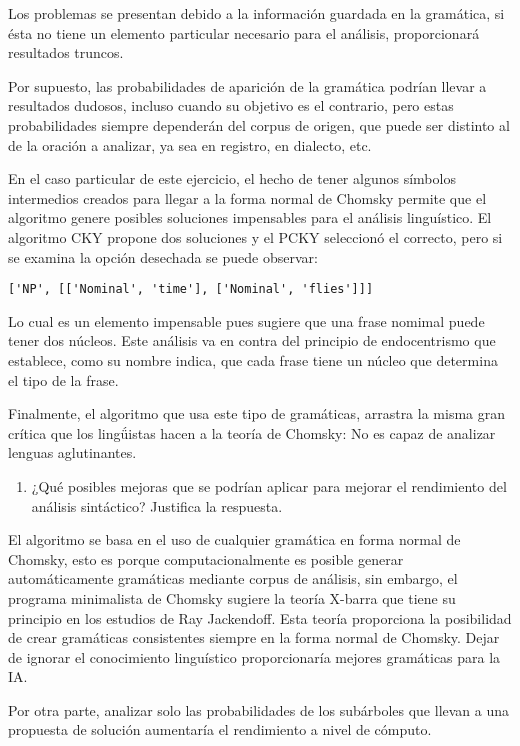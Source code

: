\documentclass[12pt,a4paper,table]{article}
\providecommand{\tightlist}{%
      \setlength{\itemsep}{0pt}\setlength{\parskip}{0pt}}
\begin{document}
Los problemas se presentan debido a la información guardada en la
gramática, si ésta no tiene un elemento particular necesario para el
análisis, proporcionará resultados truncos.

Por supuesto, las probabilidades de aparición de la gramática podrían
llevar a resultados dudosos, incluso cuando su objetivo es el contrario,
pero estas probabilidades siempre dependerán del corpus de origen, que
puede ser distinto al de la oración a analizar, ya sea en registro, en
dialecto, etc.

En el caso particular de este ejercicio, el hecho de tener algunos
símbolos intermedios creados para llegar a la forma normal de Chomsky
permite que el algoritmo genere posibles soluciones impensables para el
análisis linguístico. El algoritmo CKY propone dos soluciones y el PCKY
seleccionó el correcto, pero si se examina la opción desechada se puede
observar:

\begin{verbatim}
['NP', [['Nominal', 'time'], ['Nominal', 'flies']]]
\end{verbatim}

Lo cual es un elemento impensable pues sugiere que una frase nomimal
puede tener dos núcleos. Este análisis va en contra del principio de
endocentrismo que establece, como su nombre indica, que cada frase tiene
un núcleo que determina el tipo de la frase.

Finalmente, el algoritmo que usa este tipo de gramáticas, arrastra la
misma gran crítica que los lingǘistas hacen a la teoría de Chomsky: No
es capaz de analizar lenguas aglutinantes.

\begin{enumerate}
\def\labelenumi{\arabic{enumi}.}
\setcounter{enumi}{2}
\tightlist
\item
  ¿Qué posibles mejoras que se podrían aplicar para mejorar el
  rendimiento del análisis sintáctico? Justifica la respuesta.
\end{enumerate}

El algoritmo se basa en el uso de cualquier gramática en forma normal de
Chomsky, esto es porque computacionalmente es posible generar
automáticamente gramáticas mediante corpus de análisis, sin embargo, el
programa minimalista de Chomsky sugiere la teoría X-barra que tiene su
principio en los estudios de Ray Jackendoff. Esta teoría proporciona la
posibilidad de crear gramáticas consistentes siempre en la forma normal
de Chomsky. Dejar de ignorar el conocimiento linguístico proporcionaría
mejores gramáticas para la IA.

Por otra parte, analizar solo las probabilidades de los subárboles que
llevan a una propuesta de solución aumentaría el rendimiento a nivel de
cómputo.

    
    
    
\end{document}
